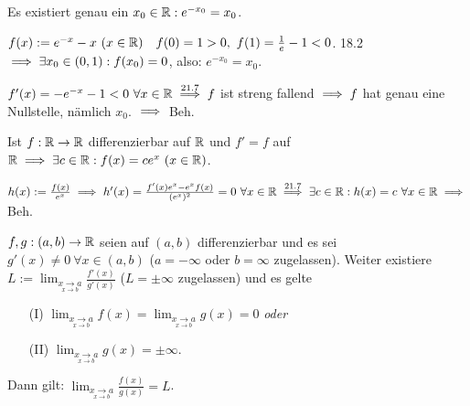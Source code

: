 \documentclass[a4paper,twoside,DIV15,BCOR12mm]{scrbook}
\begin{document}
\begin{beispiele}
\item Es existiert genau ein $x_0 \in \mathbb{R}: e^{-x_0} = x_0$.
	\begin{beweis}
	$f(x) := e^{-x}-x\ (x \in \mathbb{R})\quad f(0) = 1 > 0,\ f(1) = \frac{1}{e}-1 < 0$. 18.2 $\implies \exists x_0 \in (0,1): f(x_0) = 0$, also: $e^{-x_0} = x_0$.

	$f'(x) = -e^{-x}-1 < 0\ \forall x \in \mathbb{R} \overset{\text{21.7}}{\implies} f$ ist streng fallend $\implies f$ hat genau eine Nullstelle, nämlich $x_0$. $\implies$ Beh.
	\end{beweis}
\item Ist $f: \mathbb{R} \to \mathbb{R}$ differenzierbar auf $\mathbb{R}$ und $f' = f$ auf $\mathbb{R} \implies \exists c \in \mathbb{R}: f(x) = ce^x\ (x \in \mathbb{R})$.
	\begin{beweis}
	$h(x) := \frac{f(x)}{e^x} \implies h'(x) = \frac{f'(x)e^x - e^xf(x)}{(e^x)^2} = 0\ \forall x \in \mathbb{R} \overset{\text{21.7}}{\implies} \exists c \in \mathbb{R}: h(x) = c\ \forall x \in \mathbb{R} \implies$ Beh.
	\end{beweis}
\end{beispiele}

\newcommand{\dlim}[2]{\displaystyle{\lim_{#1}{#2}}}

\begin{satz}
$f,g:(a,b) \to \mathbb{R}$ seien auf $(a,b)$ differenzierbar und es sei $g'(x) \ne 0\ \forall x \in (a,b)$ ($a=-\infty$ oder $b=\infty$ zugelassen). Weiter existiere $L := \dlim{\underset{x \to b}{x \to a}}{\frac{f'(x)}{g'(x)}}$ ($L=\pm\infty$ zugelassen) und es gelte
\begin{enumerate}
\item[(I)] $\dlim{\underset{x \to b}{x \to a}}{f(x)} = \dlim{\underset{x \to b}{x \to a}}{g(x)} = 0$ \emph{oder}
\item[(II)] $\dlim{\underset{x \to b}{x \to a}}{g(x)} = \pm\infty$.
\end{enumerate}

Dann gilt: $\dlim{\underset{x \to b}{x \to a}}{\frac{f(x)}{g(x)}} = L$.
\end{satz}
\end{document}
